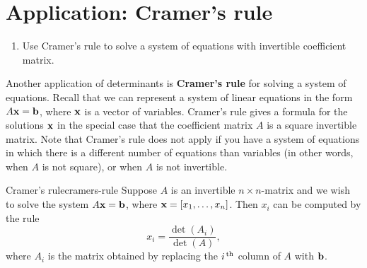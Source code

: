 \section{Application: Cramer's rule}

\begin{outcome}
  \begin{enumerate}
  \item Use Cramer's rule to solve a system of equations with
    invertible coefficient matrix.
  \end{enumerate}
\end{outcome}

Another application of determinants is \textbf{Cramer's rule} for
solving a system of equations. Recall that we can represent a system
of linear equations in the form $A\vect{x}=\vect{b}$, where $\vect{x}$
is a vector of variables. Cramer's rule gives a formula for the
solutions $\vect{x}$ in the special case that the coefficient matrix
$A$ is a square invertible matrix. Note that Cramer's rule does not
apply if you have a system of equations in which there is a different
number of equations than variables (in other words, when $A$ is not
square), or when $A$ is not invertible.

\begin{theorem}{Cramer's rule}{cramers-rule}
  Suppose $A$ is an invertible $n\times n$-matrix and we wish to solve
  the system $A\vect{x}=\vect{b}$, where
  $\vect{x}=\mat{x_1,\ldots,x_n}$.  Then $x_i$ can be computed by the
  rule%
  \begin{equation*}
    x_i = \frac{\det(A_i)}{\det(A)},
  \end{equation*}
  where $A_i$ is the matrix obtained by replacing the $i^{\,\rm th}$ column
  of $A$ with $\vect{b}$.
\end{theorem}

